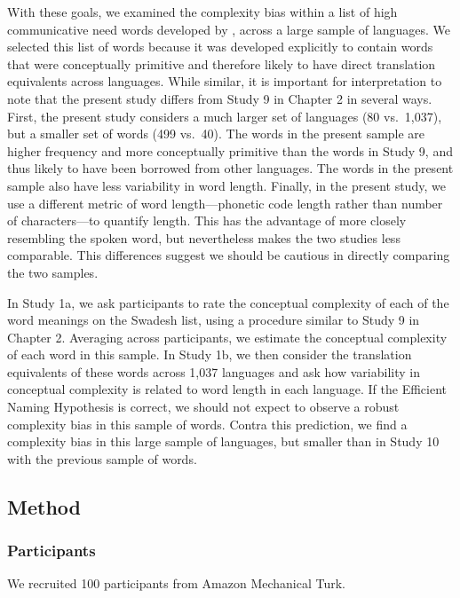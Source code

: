 With these goals, we examined the complexity bias within a list of high communicative need words  developed by  , across a large sample of languages. We selected this list of words because it was developed explicitly to contain words that were conceptually primitive and therefore likely to have direct translation equivalents across languages. While similar, it is important for interpretation to note that the present study differs from Study 9 in Chapter 2 in several ways. First, the present study considers a much larger set of languages (80 vs.\ 1,037), but a smaller set of words (499 vs.\ 40). The words in the present sample are higher frequency and more conceptually primitive than the words in Study 9, and thus likely to have been borrowed from other languages. The words in the present sample also have less variability in word length. Finally, in the present study, we use a different metric of word length---phonetic code length rather than number of characters---to quantify length. This has the advantage of more closely resembling the spoken word, but nevertheless makes the two studies less comparable. This differences suggest we should be cautious in directly comparing the two samples. 

In Study 1a, we ask participants to rate the conceptual complexity of each of the word meanings on the Swadesh list, using a procedure similar to Study 9 in Chapter 2. Averaging across participants, we  estimate the conceptual complexity of each word in this sample.  In Study 1b, we then consider the translation equivalents of these words across 1,037 languages and ask how variability in conceptual complexity is related to word length in each language. If the Efficient Naming Hypothesis is correct, we should not expect to observe a robust complexity bias in this sample of words. Contra this prediction, we find a complexity bias in this large sample of languages, but smaller than in Study 10 with the previous sample of words.


\subsection{Method}
\subsubsection{Participants} We recruited 100 participants from Amazon Mechanical Turk.

